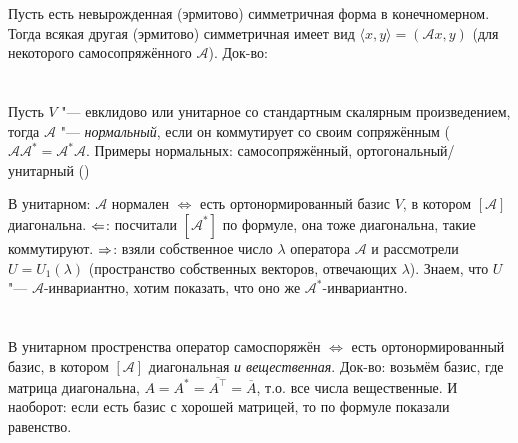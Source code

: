 Пусть есть невырожденная (эрмитово) симметричная форма в конечномерном.
Тогда всякая другая (эрмитово) симметричная имеет вид $\langle x, y \rangle = (\mathcal A x, y)$ (для некоторого самосопряжённого $\mathcal A$).
Док-во: \TODO  %

\section{} %
Пусть $V$ "--- евклидово или унитарное со стандартным скалярным произведением, тогда $\mathcal A$ "--- \textit{нормальный}, если он коммутирует
со своим сопряжённым ($\mathcal A \mathcal A^* = \mathcal A^* \mathcal A$.
Примеры нормальных: самосопряжённый, ортогональный/унитарный (\TODO)

В унитарном: $\mathcal A$ нормален $\iff$ есть ортонормированный базис $V$, в котором $[\mathcal A]$ диагональна.
$\Leftarrow$: посчитали $[\mathcal A^*]$ по формуле, она тоже диагональна, такие коммутируют.
$\Rightarrow$: взяли собственное число $\lambda$ оператора $\mathcal{A}$ и рассмотрели $U=U_1(\lambda)$ (пространство собственных векторов, отвечающих $\lambda$).
Знаем, что $U$ "--- $\mathcal A$-инвариантно, хотим показать, что оно же $\mathcal A^*$-инвариантно.
\TODO  %

\section{} %
В унитарном простренства оператор самоспоряжён $\iff$ есть ортонормированный базис, в котором $[ \mathcal A ]$ диагональная \textit{и вещественная}.
Док-во: возьмём базис, где матрица диагональна, $A = A^* = \overline{A^\top} = \overline{A}$, т.о. все числа вещественные.
И наоборот: если есть базис с хорошей матрицей, то по формуле показали равенство.
\TODO

\section{} %

\TODO

\section{} %

\TODO
